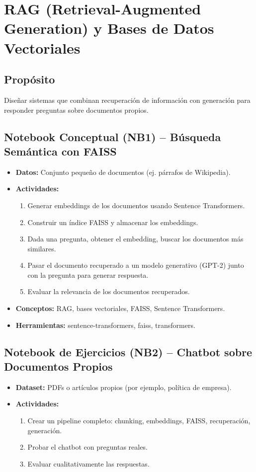 \documentclass[12pt,a4paper]{article}
\begin{document}
\section{RAG (Retrieval-Augmented Generation) y Bases de Datos Vectoriales}
\subsection*{Propósito}
Diseñar sistemas que combinan recuperación de información con generación para responder preguntas sobre documentos propios.

\subsection*{Notebook Conceptual (NB1) – Búsqueda Semántica con FAISS}
\begin{itemize}
    \item \textbf{Datos:} Conjunto pequeño de documentos (ej. párrafos de Wikipedia).
    \item \textbf{Actividades:}
    \begin{enumerate}
        \item Generar embeddings de los documentos usando Sentence Transformers.
        \item Construir un índice FAISS y almacenar los embeddings.
        \item Dada una pregunta, obtener el embedding, buscar los documentos más similares.
        \item Pasar el documento recuperado a un modelo generativo (GPT-2) junto con la pregunta para generar respuesta.
        \item Evaluar la relevancia de los documentos recuperados.
    \end{enumerate}
    \item \textbf{Conceptos:} RAG, bases vectoriales, FAISS, Sentence Transformers.
    \item \textbf{Herramientas:} sentence-transformers, faiss, transformers.
\end{itemize}

\subsection*{Notebook de Ejercicios (NB2) – Chatbot sobre Documentos Propios}
\begin{itemize}
    \item \textbf{Dataset:} PDFs o artículos propios (por ejemplo, política de empresa).
    \item \textbf{Actividades:}
    \begin{enumerate}
        \item Crear un pipeline completo: chunking, embeddings, FAISS, recuperación, generación.
        \item Probar el chatbot con preguntas reales.
        \item Evaluar cualitativamente las respuestas.
    \end{enumerate}
\end{itemize}
\end{document}
